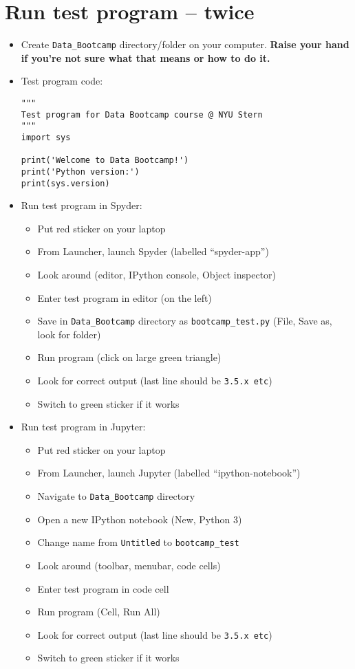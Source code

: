 \documentclass[11pt]{article}
\begin{document}
\section*{Run test program -- twice}

\begin{itemize}
\item Create \verb|Data_Bootcamp| directory/folder on your computer.
{\bf Raise your hand if you're not sure what that means or how to do it.}

\item Test program code:

\vspace{-0.1in}
\begin{verbatim}
"""
Test program for Data Bootcamp course @ NYU Stern
"""
import sys

print('Welcome to Data Bootcamp!')
print('Python version:')
print(sys.version)
\end{verbatim}

\item Run test program in Spyder:
\begin{itemize}
\item Put red sticker on your laptop
\item From Launcher, launch Spyder (labelled ``spyder-app'')
\item Look around (editor, IPython console, Object inspector)
\item Enter test program in editor (on the left)
\item Save in \verb|Data_Bootcamp| directory as \verb|bootcamp_test.py|
(File, Save as, look for folder)
\item Run program (click on large green triangle)
\item Look for correct output (last line should be {\tt 3.5.x etc})
\item Switch to green sticker if it works
\end{itemize}

\item Run test program in Jupyter:
\begin{itemize}
\item Put red sticker on your laptop
\item From Launcher, launch Jupyter (labelled ``ipython-notebook'')
\item Navigate to \verb|Data_Bootcamp| directory
\item Open a new IPython notebook (New, Python 3)
\item Change name from {\tt Untitled} to \verb|bootcamp_test|
\item Look around (toolbar, menubar, code cells)
\item Enter test program in code cell
\item Run program (Cell, Run All)
\item Look for correct output (last line should be {\tt 3.5.x etc})
\item Switch to green sticker if it works
\end{itemize}
\end{itemize}
\end{document}
